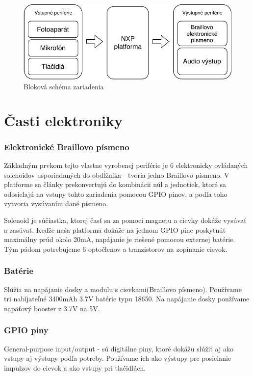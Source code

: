 \documentclass{template/socthesis}
\begin{document}
\begin{center}
	\begin{figure}[htp]
		\centering
		\includegraphics{brailleblock}
		\caption{Bloková schéma zariadenia}
	\end{figure}
\end{center}

\section{Časti elektroniky}
\subsubsection{Elektronické Braillovo písmeno}
Základným prvkom tejto vlastne vyrobenej periférie je 6 elektronicky ovládaných solenoidov usporiadaných do obdĺžnika - tvoria jedno Braillovo písmeno. V platforme sa články prekonvertujú do kombinácii núl a jednotiek, ktoré sa odosielajú na vstupy tohto zariadenia pomocou GPIO pinov, a podľa toho vytvoria vysúvaním dané písmeno. 

Solenoid je súčiastka, ktorej časť sa za pomoci magnetu a cievky dokáže vysúvať a zasúvať. Keďže naša platforma dokáže na jednom GPIO pine poskytnúť maximálny prúd okolo 20mA, napájanie je riešené pomocou externej batérie. Tým pádom potrebujeme 6 optočlenov a tranzistorov na zopínanie cievok.

\subsubsection{Batérie}
Slúžia na napájanie dosky a modulu s cievkami(Braillovo písmeno). Používame tri nabíjateľné 3400mAh 3.7V batérie typu 18650. Na napájanie dosky používame napäťový booster z 3.7V na 5V.

\subsubsection{GPIO piny}
General-purpose input/output - sú digitálne piny, ktoré dokážu slúžiť aj ako vstupy aj výstupy podľa potreby. Používame ich ako výstupy pre posielanie impulzov do cievok a ako vstupy pri tlačidlách. 
\end{document}
